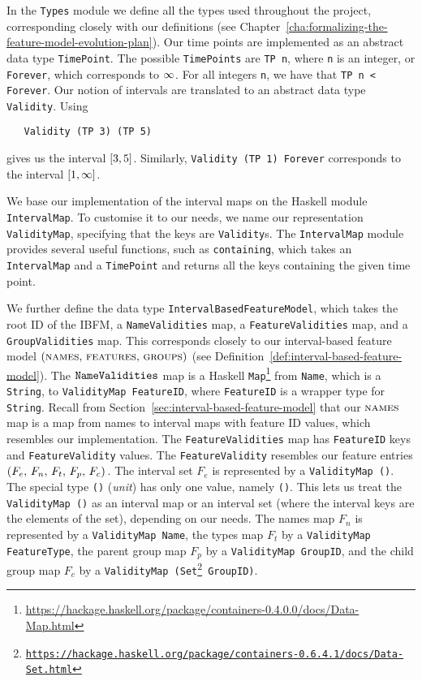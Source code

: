 In the \texttt{Types} module we define all the types used throughout the project, corresponding closely with our definitions (see Chapter~\vref{cha:formalizing-the-feature-model-evolution-plan}). Our time points are implemented as an abstract data type \texttt{TimePoint}. The possible \texttt{TimePoints} are \texttt{TP n}, where \texttt{n} is an integer, or \texttt{Forever}, which corresponds to $\infty$. For all integers \texttt{n}, we have that \texttt{TP n < Forever}. Our notion of intervals are translated to an abstract data type \texttt{Validity}. Using
\begin{verbatim}
   Validity (TP 3) (TP 5)
\end{verbatim}
gives us the interval $\interval{3}{5}$. Similarly, \texttt{Validity (TP 1) Forever} corresponds to the interval $\interval{1}{\forever}$. 

We base our implementation of the interval maps on the Haskell module \texttt{Interval\-Map}. To customise it to our needs, we name our representation \texttt{Validity\-Map}, specifying that the keys are \texttt{Validity}s. The \texttt{IntervalMap} module provides several useful functions, such as \texttt{containing}, which takes an \texttt{Interval\-Map} and a \texttt{Time\-Point} and returns all the keys containing the given time point.

We further define the data type \texttt{Interval\-Based\-Feature\-Model}, which takes the root ID of the IBFM, a \texttt{Name\-Validities} map, a \texttt{Feature\-Validities} map, and a \texttt{Group\-Validities} map. This corresponds closely to our interval-based feature model  $(\nobreak \textsc{names},\,\textsc{features},\, \textsc{groups}{})$ (see Definition~\vref{def:interval-based-feature-model}). The $\texttt{Name\-Validities}$ map is a Haskell \texttt{Map}\footnote{\url{https://hackage.haskell.org/package/containers-0.4.0.0/docs/Data-Map.html}} from \texttt{Name}, which is a \texttt{String}, to \texttt{Validity\-Map FeatureID}, where \texttt{FeatureID} is a wrapper type for \texttt{String}. Recall from Section~\ref{sec:interval-based-feature-model} that our $\textsc{names}{}$ map is a map from names to interval maps with feature ID values, which resembles our implementation. The \texttt{Feature\-Validities} map has \texttt{Feature\-ID} keys and \texttt{Feature\-Validity} values. The \texttt{Feature\-Validity} resembles our feature entries $\left(F_e,\, F_n,\, F_t,\, F_p,\, F_c\right){}$. The interval set $F_e$ is represented by a \texttt{Validity\-Map ()}. The special type \texttt{()} (\emph{unit}) has only one value, namely \texttt{()}. This lets us treat the \texttt{Validity\-Map ()} as an interval map or an interval set (where the interval keys are the elements of the set), depending on our needs. The names map $F_n$ is represented by a \texttt{Validity\-Map Name}, the types map $F_t$ by a \texttt{Validity\-Map Feature\-Type}, the parent group map $F_p$ by a \texttt{Validity\-Map Group\-ID}, and the child group map $F_c$ by a \texttt{Validity\-Map (Set\footnote{\url{https://hackage.haskell.org/package/containers-0.6.4.1/docs/Data-Set.html}} Group\-ID)}.

